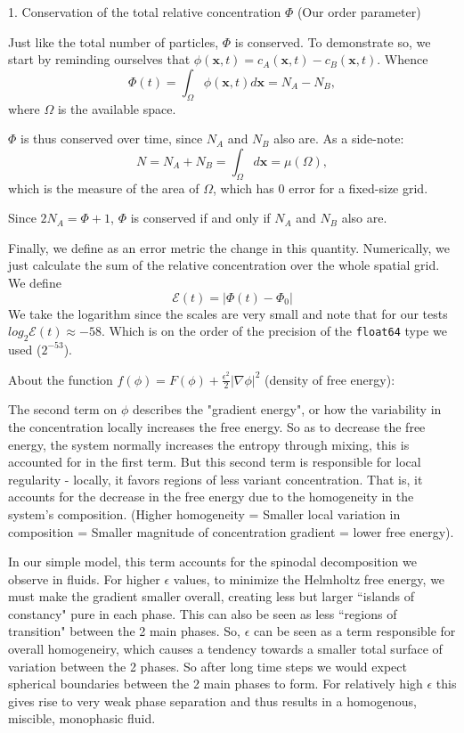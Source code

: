 \documentclass{article}
\begin{document}
1. Conservation of the total relative concentration $\Phi$ (Our order parameter)

Just like the total number of particles, $\Phi$ is conserved.
To demonstrate so, we start by reminding ourselves that $\phi(\mathbf{x},t) = c_A(\mathbf{x},t)-c_B(\mathbf{x},t)$.
Whence \[ \Phi(t) = \int_{\Omega} \phi(\mathbf{x},t)d\mathbf{x} = N_A - N_B, \]
where $\Omega$ is the available space.

$\Phi$ is thus conserved over time, since $N_A$ and $N_B$ also are.
As a side-note: \[ N = N_A + N_B = \int_{\Omega} d\mathbf{x} = \mu(\Omega), \]
which is the measure of the area of $\Omega$, which has 0 error for a fixed-size grid.

Since $2N_A = \Phi+1$, $\Phi$ is conserved if and only if $N_A$ and $N_B$ also are.

Finally, we define as an error metric the change in this quantity.
Numerically, we just calculate the sum of the relative concentration over the whole spatial grid.
We define
\[ \mathcal{E}(t) = |\Phi(t) - \Phi_0| \]
We take the logarithm since the scales are very small and note that for our tests $log_{2}\mathcal{E}(t) \approx -58$.
Which is on the order of the precision of the \verb`float64` type we used ($2^{-53}$).

About the function $f(\phi) = F(\phi) + \frac{\epsilon^2}{2}|\nabla{\phi}|^2$ (density of free energy):

The second term on $\phi$ describes the "gradient energy", or how the variability in the concentration locally increases the free energy.
So as to decrease the free energy, the system normally increases the entropy through mixing, this is accounted for in the first term.
But this second term is responsible for local regularity - locally, it favors regions of less variant concentration.
That is, it accounts for the decrease in the free energy due to the homogeneity in the system's composition.
(Higher homogeneity = Smaller local variation in composition = Smaller magnitude of concentration gradient = lower free energy).

In our simple model, this term accounts for the spinodal decomposition we observe in fluids.
For higher $\epsilon$ values, to minimize the Helmholtz free energy, we must make the gradient smaller overall, creating less but larger ``islands of constancy" pure in each phase.
This can also be seen as less ``regions of transition" between the 2 main phases.
So, $\epsilon$ can be seen as a term responsible for overall homogeneiry, which causes a tendency towards a smaller total surface of variation between the 2 phases.
So after long time steps we would expect spherical boundaries between the 2 main phases to form.
For relatively high $\epsilon$ this gives rise to very weak phase separation and thus results in a homogenous, miscible, monophasic fluid.
\end{document}
